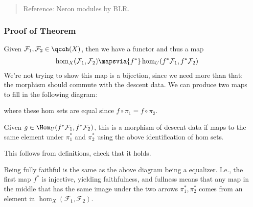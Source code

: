 \begin{quote}
Reference: Neron modules by BLR.
\end{quote}

\hypertarget{proof-of-theorem}{%
\subsubsection{Proof of Theorem}\label{proof-of-theorem}}

Given \(\mathcal{F}_1, \mathcal{F}_2 \in \qcoh(X)\), then we have a
functor and thus a map
\begin{align*}
\hom_X(\mathcal{F}_1, \mathcal{F}_2) \mapsvia{f^*} \hom_U(f^*\mathcal{F}_1, f^*\mathcal{F}_2)
\end{align*} We're not trying to show this map is a bijection, since we
need more than that: the morphism should commute with the descent data.
We can produce two maps to fill in the following diagram:

\begin{center}
\end{center}

where these hom sets are equal since \(f\circ \pi_1 = f\circ \pi_2\).

\begin{claim}

Given \(g\in \Hom_U(f^* \mathcal{F}_1, f^* \mathcal{F}_2)\), this is a
morphism of descent data if maps to the same element under \(\pi_1^*\)
and \(\pi_2^*\) using the above identification of hom sets.

\end{claim}

\begin{exercise}[?]

This follows from definitions, check that it holds.

\end{exercise}

Being fully faithful is the same as the above diagram being a equalizer.
I.e., the first map \(f^*\) is injective, yielding faithfulness, and
fullness means that any map in the middle that has the same image under
the two arrows \(\pi_1^*, \pi_2^*\) comes from an element in
\(\hom_X(\mathcal{F}_1, \mathcal{F}_2)\).

